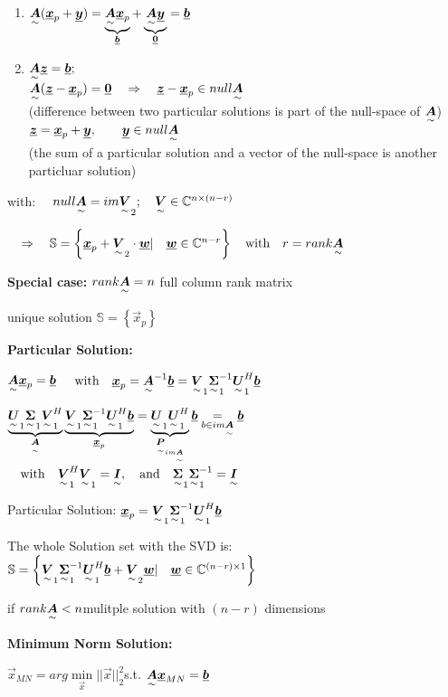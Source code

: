 \begin{enumerate}
\item $\ma{A}(\vec{x}_p+\vec{y})=\underbrace{\ma{A}\vec{x}_p}_{\vec{b}}+\underbrace{\ma{A}\vec{y}}_{\vec{0}}=\vec{b}$
\item $\ma{A}\vec{z}=\vec{b};$
\\
$\ma{A}(\vec{z}-\vec{x}_p)=\vec{0}\pfeil \vec{z}-\vec{x}_p\in null\ma{A}$
\\ {\footnotesize(difference between two particular solutions is part of the null-space of $\ma{A}$)}
\\
$\vec{z}=\vec{x}_p+\vec{y}, \qquad \vec{y}\in null\ma{A}$
\\ {\footnotesize(the sum of a particular solution and a vector of the null-space is another particluar solution)}
\end{enumerate}

with: $\quad null\ma{A}=im\ma{V}_2; \quad \ma{V}\in\mathbb{C}^{n\times (n-r)}$

$\pfeil\mathbb{S}=\left\lbrace \vec{x}_p+\ma{V}_2\cdot\vec{w} |\quad \vec{w}\in \mathbb{C}^{n-r} \right\rbrace \with r=rank\ma{A}$


\textbf{Special case: } 
$rank\ma{A}=n$ \qquad full column rank matrix 

unique solution \quad $\mathbb{S}=\left\lbrace \vec{x}_p  \right\rbrace$

\textbf{Particular Solution:}

$\ma{A}\vec{x}_p=\vec{b}$
$\with \vec{x}_p=\ma{A}^{-1}\vec{b}=\ma{V}_1\ma{\Sigma}_1^{-1}\ma{U}_1^H\vec{b} $

$\underbrace{\ma{U}_1\ma{\Sigma}_1\ma{V}_1^H}_{\ma{A}}\underbrace{\ma{V}_1\ma{\Sigma}_1^{-1}\ma{U}_1^H\vec{b}}_{\vec{x}_p}=\underbrace{\ma{U}_1\ma{U}_1^H}_{\ma{P}_{im\ma{A}}}\vec{b}\underset{b\in im\ma{A}}{=}\vec{b}$
$\with \ma{V}_1^H\ma{V}_1=\ma{I}, \quad \text{and}\quad \ma{\Sigma}_1\ma{\Sigma}_1^{-1}=\ma{I} $

Particular Solution: $\vec{x}_p=\ma{V}_1\ma{\Sigma}_1^{-1}\ma{U}_1^H\vec{b}$

The whole Solution set with the SVD is: \quad
$\mathbb{S}=\left\lbrace \ma{V}_1\ma{\Sigma}_1^{-1}\ma{U}_1^H\vec{b}+\ma{V}_2\vec{w} |\quad \vec{w}\in \mathbb{C}^{(n-r)\times 1} \right\rbrace$ 

if $rank\ma{A}<n$\pfeil mulitple solution with  $(n-r)$ dimensions 


\textbf{Minimum Norm Solution:}

$\vec{x}_{MN}=arg\min\limits_{\vec{x}}||\vec{x}||^2_2$\quad s.t. $\ma{A}\vec{x}_{MN}=\vec{b}$


